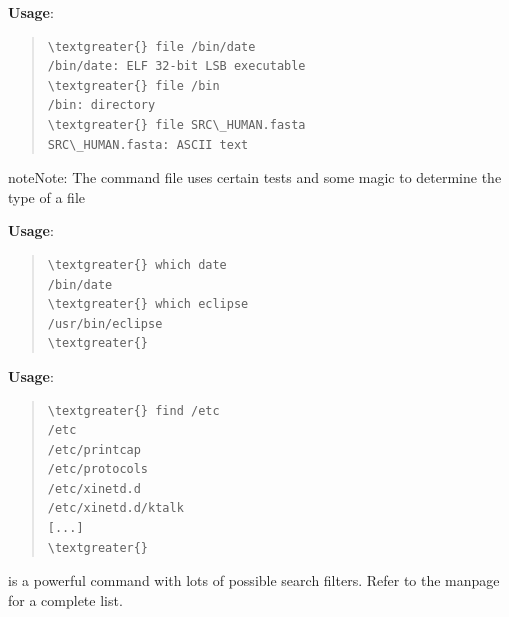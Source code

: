 \documentclass[letterpaper,10pt,english]{sphinxmanual}
\begin{document}
\textbf{Usage}:  
\begin{quote}

\begin{Verbatim}[commandchars=\\\{\}]
\textgreater{} file /bin/date
/bin/date: ELF 32-bit LSB executable
\textgreater{} file /bin
/bin: directory
\textgreater{} file SRC\_HUMAN.fasta
SRC\_HUMAN.fasta: ASCII text
\end{Verbatim}
\end{quote}

\begin{notice}{note}{Note:}
The command file uses certain tests and some magic to determine the type of a file
\end{notice}

\textbf{Usage}:  
\begin{quote}

\begin{Verbatim}[commandchars=\\\{\}]
\textgreater{} which date
/bin/date
\textgreater{} which eclipse
/usr/bin/eclipse
\textgreater{}
\end{Verbatim}
\end{quote}

\textbf{Usage}:  
\begin{quote}

\begin{Verbatim}[commandchars=\\\{\}]
\textgreater{} find /etc
/etc
/etc/printcap
/etc/protocols
/etc/xinetd.d
/etc/xinetd.d/ktalk
[...]
\textgreater{}
\end{Verbatim}
\end{quote}

 is a powerful command with lots of possible search filters.  Refer to the manpage for a complete list.
\end{document}
